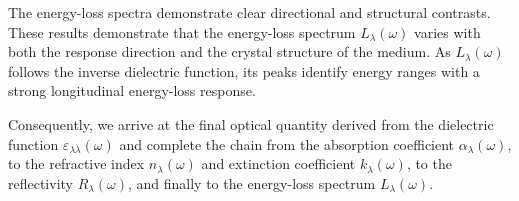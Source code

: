 The energy-loss spectra demonstrate clear directional and structural contrasts.
These results demonstrate that the energy-loss spectrum $L_{\lambda}(\omega)$ varies with both the response direction and the crystal structure of the medium.
As $L_{\lambda}(\omega)$ follows the inverse dielectric function,
its peaks identify energy ranges with a strong longitudinal energy-loss response.

Consequently, we arrive at the final optical quantity derived from the dielectric function $\varepsilon_{\lambda\lambda}(\omega)$ and complete the chain from the absorption coefficient $\alpha_{\lambda}(\omega)$,
to the refractive index $n_{\lambda}(\omega)$ and extinction coefficient $k_{\lambda}(\omega)$, to the reflectivity $R_{\lambda}(\omega)$, and finally to the energy-loss spectrum $L_{\lambda}(\omega)$.
